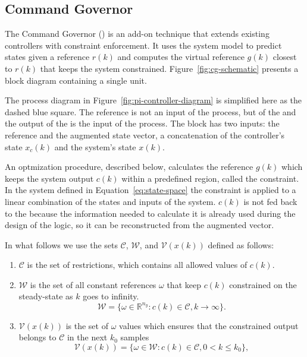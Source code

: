 \subsection{Command Governor}%
\label{subsec:cg}

The Command Governor (\CG{}) is an add-on technique that extends existing
controllers with constraint enforcement. It uses the system model to predict
states given a reference \(r(k)\) and computes the virtual reference \(g(k)\)
closest to \(r(k)\) that keeps the system constrained.
Figure~\ref{fig:cg-schematic} presents a block diagram containing a single \CG{}
unit.



The process diagram in Figure~\ref{fig:pi-controller-diagram} is simplified here
as the dashed blue square. The reference is not an input of the process, but of
the \CG{} and the output of the \CG{} is the input of the process. The \CG{}
block has two inputs: the reference and the augmented state vector, a
concatenation of the controller's state \(x_{c}(k)\) and the system's state
\(x(k)\).

An optmization procedure, described below, calculates the reference \(g(k)\)
which keeps the system output \(c(k)\) within a predefined region, called the
constraint. In the system defined in Equation~\eqref{eq:state-space} the
constraint is applied to a linear combination of the states and inputs of the
system. \(c(k)\) is not fed back to the \CG{} because the information needed to
calculate it is already used during the design of the \CG{} logic, so it can be
reconstructed from the augmented vector.

In what follows we use the sets \(\mathcal{C}\), \(\mathcal{W}\), and
\(\mathcal{V}(x(k))\) defined as follows:

\begin{enumerate}
  \item \(\mathcal{C}\) is the set of restrictions, which contains all allowed
        values of \(c(k)\).
  \item \(\mathcal{W}\) is the set of all constant references \(\omega{}\) that keep
        \(c(k)\) constrained on the steady-state as \(k\) goes to infinity.
        \[\mathcal{W} = \{\omega\in\mathbb{R}^{n_y}:
          c(k)\in\mathcal{C},k\rightarrow\infty{}\}.\]
  \item \(\mathcal{V}(x(k))\) is the set of \(\omega{}\) values which ensures that the
        constrained output belongs to \(\mathcal{C}\) in the next \(k_0\)
        samples
        \[
          \mathcal{V}(x(k))=\{\omega\in\mathcal{W}:c(k)\in\mathcal{C},0<k\leq{}k_0\},
        \]
\end{enumerate}

